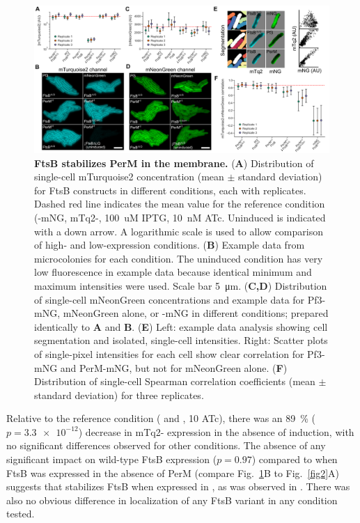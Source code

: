 \documentclass[pdflatex,sn-basic]{sn-jnl}%
\begin{document}
\begin{figure}[h]
\centering
\includegraphics[width=1.0\textwidth]{../figures/fig3.png}
\caption{\textbf{FtsB stabilizes PerM in the \ec{} membrane.} (\textbf{A}) Distribution of single-cell mTurquoise2 concentration (mean $\pm$ standard deviation) for FtsB constructs in different conditions, each with replicates. Dashed red line indicates the mean value for the reference condition (\permN{}-mNG, mTq2-\ftsbdLQ{}, \qty{100}{uM} IPTG, \qty{10}{nM} ATc. Uninduced \ftsbdLQ{} is indicated with a down arrow. A logarithmic scale is used to allow comparison of high- and low-expression conditions. (\textbf{B}) Example data from microcolonies for each condition. The uninduced \ftsbdLQ{} condition has very low fluorescence in example data because identical minimum and maximum intensities were used. Scale bar \qty{5}{\um}. (\textbf{C,D}) Distribution of single-cell mNeonGreen concentrations and example data for Pf3-mNG, mNeonGreen alone, or \permN{}-mNG in different conditions; prepared identically to \textbf{A} and \textbf{B}. (\textbf{E}) Left: example data analysis showing cell segmentation and isolated, single-cell intensities. Right: Scatter plots of single-pixel intensities for each cell show clear correlation for Pf3-mNG and PerM-mNG, but not for mNeonGreen alone. (\textbf{F}) Distribution of single-cell Spearman correlation coefficients (mean $\pm$ standard deviation) for three replicates.}\label{fig3}
\end{figure}

Relative to the reference condition (\permN{} and \ftsbdLQ{}, \qty{10}{\nM} ATc), there was an \qty{89}{\percent} ($p=\num{3.3e-12}$) decrease in mTq2-\ftsbdLQ{} expression in the absence of induction, with no significant differences observed for other conditions. The absence of any significant impact on wild-type FtsB expression ($p=0.97$) compared to when FtsB was expressed in the absence of PerM (compare Fig.~\ref{fig3}B to Fig.~\ref{fig2}A) suggests that \permN{} stabilizes FtsB when expressed in \ec{}, as was observed in \mtb{} \citep{wangPersistentMycobacteriumTuberculosis2019}. There was also no obvious difference in localization of any FtsB variant in any condition tested.
\end{document}
